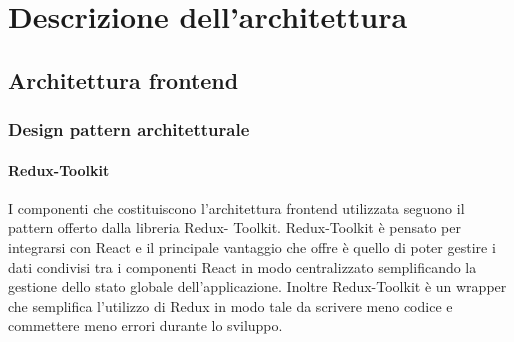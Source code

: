 \section{Descrizione dell'architettura}
\subsection{Architettura frontend}
\subsubsection{Design pattern architetturale}

\paragraph{Redux-Toolkit}
I componenti che costituiscono l'architettura frontend utilizzata seguono il
pattern offerto dalla libreria Redux- Toolkit. Redux-Toolkit è pensato per
integrarsi con React e il principale vantaggio che offre è quello di poter
gestire i dati condivisi tra i componenti React in modo centralizzato
semplificando la gestione dello stato globale dell'applicazione. Inoltre
Redux-Toolkit è un wrapper che semplifica l'utilizzo di Redux in modo tale da
scrivere meno codice e commettere meno errori durante lo sviluppo.

